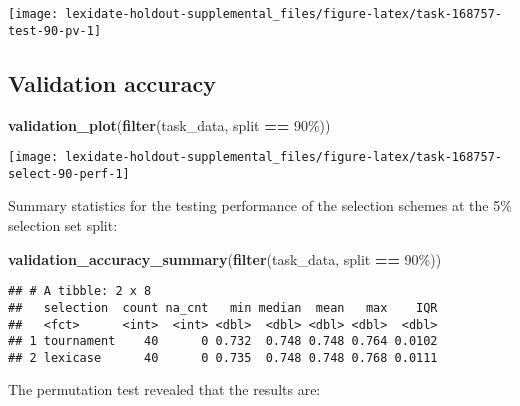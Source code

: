 \documentclass[
]{book}
\newenvironment{Shaded}{\begin{snugshade}}{\end{snugshade}}
\newcommand{\FunctionTok}[1]{\textcolor[rgb]{0.13,0.29,0.53}{\textbf{#1}}}
\newcommand{\NormalTok}[1]{#1}
\newcommand{\SpecialCharTok}[1]{\textcolor[rgb]{0.81,0.36,0.00}{\textbf{#1}}}
\newcommand{\StringTok}[1]{\textcolor[rgb]{0.31,0.60,0.02}{#1}}
\begin{document}
\texttt{[image: lexidate-holdout-supplemental\_files/figure-latex/task-168757-test-90-pv-1]}

\hypertarget{validation-accuracy-23}{%
\subsection{Validation accuracy}\label{validation-accuracy-23}}

\begin{Shaded}
\begin{Highlighting}[]
\FunctionTok{validation\_plot}\NormalTok{(}\FunctionTok{filter}\NormalTok{(task\_data, split }\SpecialCharTok{==} \StringTok{\textquotesingle{}90\%\textquotesingle{}}\NormalTok{))}
\end{Highlighting}
\end{Shaded}

\texttt{[image: lexidate-holdout-supplemental\_files/figure-latex/task-168757-select-90-perf-1]}

Summary statistics for the testing performance of the selection schemes at the 5\% selection set split:

\begin{Shaded}
\begin{Highlighting}[]
\FunctionTok{validation\_accuracy\_summary}\NormalTok{(}\FunctionTok{filter}\NormalTok{(task\_data, split }\SpecialCharTok{==} \StringTok{\textquotesingle{}90\%\textquotesingle{}}\NormalTok{))}
\end{Highlighting}
\end{Shaded}

\begin{verbatim}
## # A tibble: 2 x 8
##   selection  count na_cnt   min median  mean   max    IQR
##   <fct>      <int>  <int> <dbl>  <dbl> <dbl> <dbl>  <dbl>
## 1 tournament    40      0 0.732  0.748 0.748 0.764 0.0102
## 2 lexicase      40      0 0.735  0.748 0.748 0.768 0.0111
\end{verbatim}

The permutation test revealed that the results are:
\end{document}

